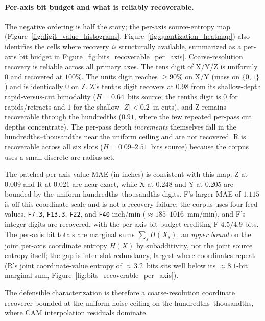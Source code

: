 \documentclass[entropy,article,submit,moreauthors,pdftex]{Definitions/mdpi}
\begin{document}
\paragraph{Per-axis bit budget and what is reliably recoverable.} The negative ordering is half the story; the per-axis source-entropy map (Figure~\ref{fig:digit_value_histograms}, Figure~\ref{fig:quantization_heatmap}) also identifies the cells where recovery \emph{is} structurally available, summarized as a per-axis bit budget in Figure~\ref{fig:bits_recoverable_per_axis}. Coarse-resolution recovery is reliable across all primary axes. The tens digit of X/Y/Z is uniformly $0$ and recovered at $100\%$. The units digit reaches $\ge\!90\%$ on X/Y (mass on $\{0,1\}$) and is identically $0$ on Z. Z's tenths digit recovers at $0.98$ from its shallow-depth rapid-versus-cut bimodality ($H=0.64$~bits source; the tenths digit is $0$ for rapids/retracts and $1$ for the shallow $|Z|<0.2$~in cuts), and Z remains recoverable through the hundredths ($0.91$, where the few repeated per-pass cut depths concentrate). The per-pass depth \emph{increments} themselves fall in the hundredths--thousandths near the uniform ceiling and are not recovered. R is recoverable across all six slots ($H=0.09$--$2.51$~bits source) because the corpus uses a small discrete arc-radius set.

The patched per-axis value MAE (in inches) is consistent with this map: Z at $0.009$ and R at $0.021$ are near-exact, while X at $0.248$ and Y at $0.205$ are bounded by the uniform hundredths--thousandths digits. F's larger MAE of $1.115$ is off this coordinate scale and is not a recovery failure: the corpus uses four feed values, \texttt{F7.3}, \texttt{F13.3}, \texttt{F22}, and \texttt{F40} inch/min ($\approx\!185$--$1016$~mm/min), and F's integer digits are recovered, with the per-axis bit budget crediting F $4.5/4.9$ bits. The per-axis bit totals are marginal sums $\sum_s H(X_s)$, an \emph{upper bound} on the joint per-axis coordinate entropy $H(X)$ by subadditivity, not the joint source entropy itself; the gap is inter-slot redundancy, largest where coordinates repeat (R's joint coordinate-value entropy of $\approx\!3.2$~bits sits well below its $\approx\!8.1$-bit marginal sum, Figure~\ref{fig:bits_recoverable_per_axis}).

The defensible characterization is therefore a coarse-resolution coordinate recoverer bounded at the uniform-noise ceiling on the hundredths--thousandths, where CAM interpolation residuals dominate.
\end{document}
